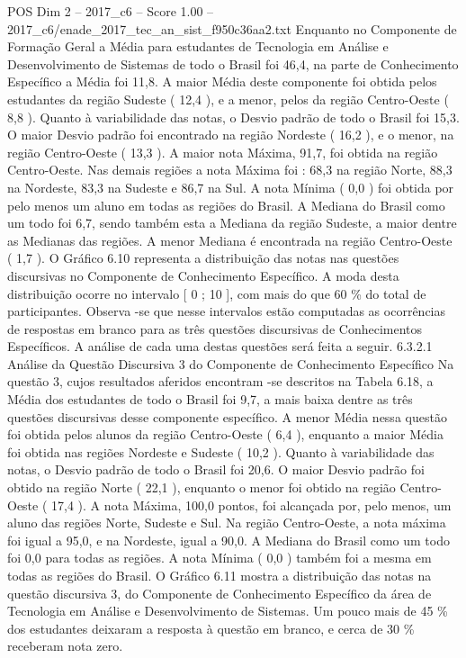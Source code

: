 \begin{textsample}{POS Dim 2 – 2017\_c6 – Score 1.00 – 2017\_c6/enade\_2017\_tec\_an\_sist\_f950c36aa2.txt}
Enquanto no Componente de Formação Geral a Média para estudantes de Tecnologia em Análise e Desenvolvimento de Sistemas de todo o Brasil foi 46,4, na parte de Conhecimento Específico a Média foi 11,8.
A maior Média deste componente foi obtida pelos estudantes da região Sudeste ( 12,4 ), e a menor, pelos da região Centro-Oeste ( 8,8 ).
Quanto à variabilidade das notas, o Desvio padrão de todo o Brasil foi 15,3.
O maior Desvio padrão foi encontrado na região Nordeste ( 16,2 ), e o menor, na região Centro-Oeste ( 13,3 ).
A maior nota Máxima, 91,7, foi obtida na região Centro-Oeste.
Nas demais regiões a nota Máxima foi : 68,3 na região Norte, 88,3 na Nordeste, 83,3 na Sudeste e 86,7 na Sul.
A nota Mínima ( 0,0 ) foi obtida por pelo menos um aluno em todas as regiões do Brasil.
A Mediana do Brasil como um todo foi 6,7, sendo também esta a Mediana da região Sudeste, a maior dentre as Medianas das regiões.
A menor Mediana é encontrada na região Centro-Oeste ( 1,7 ).
O Gráfico 6.10 representa a distribuição das notas nas questões discursivas no Componente de Conhecimento Específico.
A moda desta distribuição ocorre no intervalo [ 0 ; 10 ], com mais do que 60 \% do total de participantes.
Observa -se que nesse intervalos estão computadas as ocorrências de respostas em branco para as três questões discursivas de Conhecimentos Específicos.
A análise de cada uma destas questões será feita a seguir. 6.3.2.1 Análise da Questão Discursiva 3 do Componente de Conhecimento Específico Na questão 3, cujos resultados aferidos encontram -se descritos na Tabela 6.18, a Média dos estudantes de todo o Brasil foi 9,7, a mais baixa dentre as três questões discursivas desse componente específico.
A menor Média nessa questão foi obtida pelos alunos da região Centro-Oeste ( 6,4 ), enquanto a maior Média foi obtida nas regiões Nordeste e Sudeste ( 10,2 ).
Quanto à variabilidade das notas, o Desvio padrão de todo o Brasil foi 20,6.
O maior Desvio padrão foi obtido na região Norte ( 22,1 ), enquanto o menor foi obtido na região Centro-Oeste ( 17,4 ).
A nota Máxima, 100,0 pontos, foi alcançada por, pelo menos, um aluno das regiões Norte, Sudeste e Sul.
Na região Centro-Oeste, a nota máxima foi igual a 95,0, e na Nordeste, igual a 90,0.
A Mediana do Brasil como um todo foi 0,0 para todas as regiões.
A nota Mínima ( 0,0 ) também foi a mesma em todas as regiões do Brasil.
O Gráfico 6.11 mostra a distribuição das notas na questão discursiva 3, do Componente de Conhecimento Específico da área de Tecnologia em Análise e Desenvolvimento de Sistemas.
Um pouco mais de 45 \% dos estudantes deixaram a resposta à questão em branco, e cerca de 30 \% receberam nota zero.

\end{textsample}
